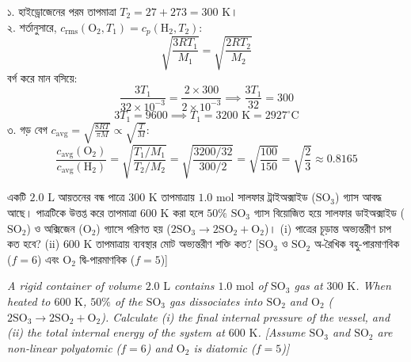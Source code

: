 \documentclass[12pt, a4paper]{article}
\begin{document}
{\vspace{1em}

\begin{tcolorbox}[solutionbox={সমাধান (Solution)}]
\noindent
১. হাইড্রোজেনের পরম তাপমাত্রা $T_2 = 27 + 273 = 300\text{ K}$। \\
২. শর্তানুসারে, $c_{\text{rms}}(\text{O}_2, T_1) = c_p(\text{H}_2, T_2)$:
\[ \sqrt{\frac{3 R T_1}{M_1}} = \sqrt{\frac{2 R T_2}{M_2}} \]
বর্গ করে মান বসিয়ে:
\[ \frac{3 T_1}{32 \times 10^{-3}} = \frac{2 \times 300}{2 \times 10^{-3}} \implies \frac{3 T_1}{32} = 300 \]
\[ 3 T_1 = 9600 \implies T_1 = 3200\text{ K} = 2927^\circ\text{C} \]
৩. গড় বেগ $c_{\text{avg}} = \sqrt{\frac{8 R T}{\pi M}} \propto \sqrt{\frac{T}{M}}$:
\[ \frac{c_{\text{avg}}(\text{O}_2)}{c_{\text{avg}}(\text{H}_2)} = \sqrt{\frac{T_1 / M_1}{T_2 / M_2}} = \sqrt{\frac{3200 / 32}{300 / 2}} = \sqrt{\frac{100}{150}} = \sqrt{\frac{2}{3}} \approx 0.8165 \]
\end{tcolorbox}

\vspace{1.5em}

\begin{tcolorbox}[questionbox={প্রশ্ন (Question) 9}]
\noindent
একটি $2.0\text{ L}$ আয়তনের বন্ধ পাত্রে $300\text{ K}$ তাপমাত্রায় $1.0\text{ mol}$ সালফার ট্রাইঅক্সাইড ($\text{SO}_3$) গ্যাস আবদ্ধ আছে। পাত্রটিকে উত্তপ্ত করে তাপমাত্রা $600\text{ K}$ করা হলে $50\%$ $\text{SO}_3$ গ্যাস বিয়োজিত হয়ে সালফার ডাইঅক্সাইড ($\text{SO}_2$) ও অক্সিজেন ($\text{O}_2$) গ্যাসে পরিণত হয় ($2\text{SO}_3 \to 2\text{SO}_2 + \text{O}_2$)। (i) পাত্রের চূড়ান্ত অভ্যন্তরীণ চাপ কত হবে? (ii) $600\text{ K}$ তাপমাত্রায় ব্যবস্থার মোট অভ্যন্তরীণ শক্তি কত? [$\text{SO}_3$ ও $\text{SO}_2$ অ-রৈখিক বহু-পারমাণবিক ($f=6$) এবং $\text{O}_2$ দ্বি-পারমাণবিক ($f=5$)]

\vspace{0.8em}
\begin{english}
\noindent\textit{\color{darkgray}
A rigid container of volume $2.0\text{ L}$ contains $1.0\text{ mol}$ of $\text{SO}_3$ gas at $300\text{ K}$. When heated to $600\text{ K}$, $50\%$ of the $\text{SO}_3$ gas dissociates into $\text{SO}_2$ and $\text{O}_2$ ($2\text{SO}_3 \to 2\text{SO}_2 + \text{O}_2$). Calculate (i) the final internal pressure of the vessel, and (ii) the total internal energy of the system at $600\text{ K}$. [Assume $\text{SO}_3$ and $\text{SO}_2$ are non-linear polyatomic ($f=6$) and $\text{O}_2$ is diatomic ($f=5$)]
}
\end{english}
\end{tcolorbox}

}
\end{document}
